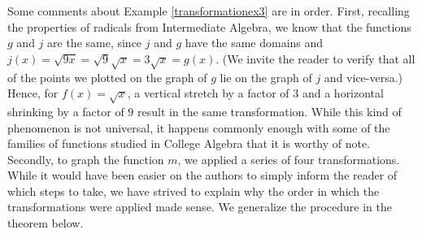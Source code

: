 Some comments about Example \ref{transformationex3} are in order.  First, recalling the properties of radicals from Intermediate Algebra, we know that the functions $g$ and $j$ are the same, since $j$ and $g$ have the same domains and $j(x) = \sqrt{9x} = \sqrt{9} \sqrt{x} = 3 \sqrt{x} = g(x)$. (We invite the reader to verify that all of the points we plotted on the graph of $g$ lie on the graph of $j$ and vice-versa.)  Hence, for  $f(x) = \sqrt{x}$, a vertical stretch by a factor of $3$ and a horizontal shrinking by a factor of $9$ result in the same transformation.  While this kind of phenomenon is not universal, it happens commonly enough with some of the families of functions studied in College Algebra that it is worthy of note.  Secondly, to graph the function $m$, we applied a series of four transformations.  While it would have been easier on the authors to simply inform the reader of which steps to take, we have strived to explain why the order in which the transformations were applied made sense.  We generalize the procedure in the theorem below.

\bigskip


